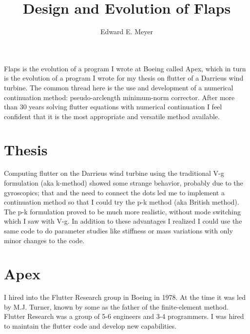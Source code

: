 \documentclass[11pt]{article}
\begin{document}
\title{\Huge Design and Evolution of Flaps}
\author{Edward E. Meyer}
\maketitle

Flaps is the evolution of a program I wrote at Boeing called Apex,
which in turn is the evolution of a program I wrote for my thesis on
flutter of a Darrieus wind turbine.
The common thread here is the use and development of a numerical continuation
method: pseudo-arclength minimum-norm corrector.
After more than 30 years solving flutter equations with numerical continuation
I feel confident that it is the most appropriate and versatile method available.

\section{Thesis}
Computing flutter on the Darrieus wind turbine using the traditional
V-g formulation (aka k-method) showed some strange behavior, probably
due to the gyroscopics; that and the need to connect the dots led me
to implement a continuation method so that I could try the p-k
method \cite{hassig1971approximate} (aka British method).
The p-k formulation proved to be
much more realistic, without mode switching which I saw with V-g.
In addition to these advantages I realized I could use the same code
to do parameter studies like stiffness or mass variations with only
minor changes to the code.

\section{Apex}
I hired into the Flutter Research group in Boeing in 1978. At the time it was
led by M.J. Turner, known by some as the father of the finite-element method.
Flutter Research was a group of 5-6 engineers and 3-4 programmers.
I was hired to maintain the flutter code and develop new capabilities.
\end{document}
